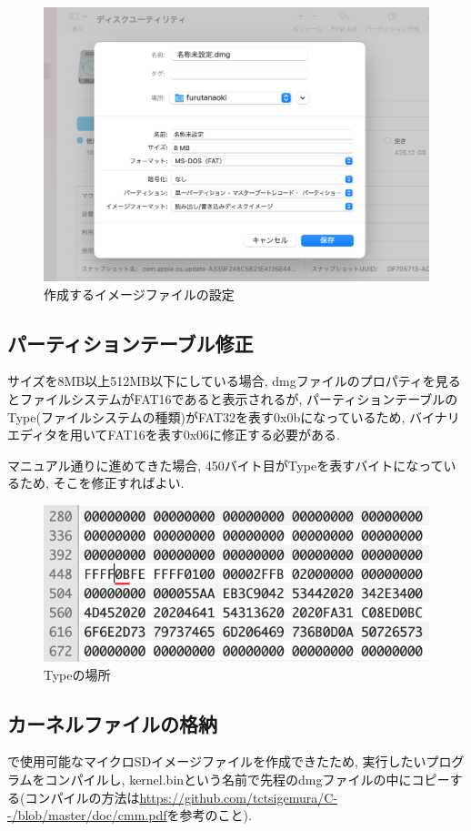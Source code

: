 \begin{figure}[H]
    \centering
    \includegraphics[width=13.5cm]{"figs/appA-diskutil.png"}
    \caption{作成するイメージファイルの設定} \label{fig:appA-diskutil}
\end{figure}

\subsection{パーティションテーブル修正}

サイズを8MB以上512MB以下にしている場合, dmgファイルのプロパティを見るとファイルシステムがFAT16であると表示されるが, パーティションテーブルのType(ファイルシステムの種類)がFAT32を表す0x0bになっているため, バイナリエディタを用いてFAT16を表す0x06に修正する必要がある. 

マニュアル通りに進めてきた場合, 450バイト目がTypeを表すバイトになっているため, そこを修正すればよい.

\begin{figure}[H]
    \centering
    \includegraphics[width=12cm]{"figs/appA-binaryEditor.png"}
    \caption{Typeの場所} \label{fig:appA-binedit}
\end{figure}

\subsection{カーネルファイルの格納}

\tacsim で使用可能なマイクロSDイメージファイルを作成できたため, 実行したいプログラムをコンパイルし, kernel.binという名前で先程のdmgファイルの中にコピーする(コンパイルの方法は\url{https://github.com/tctsigemura/C--/blob/master/doc/cmm.pdf}を参考のこと).
